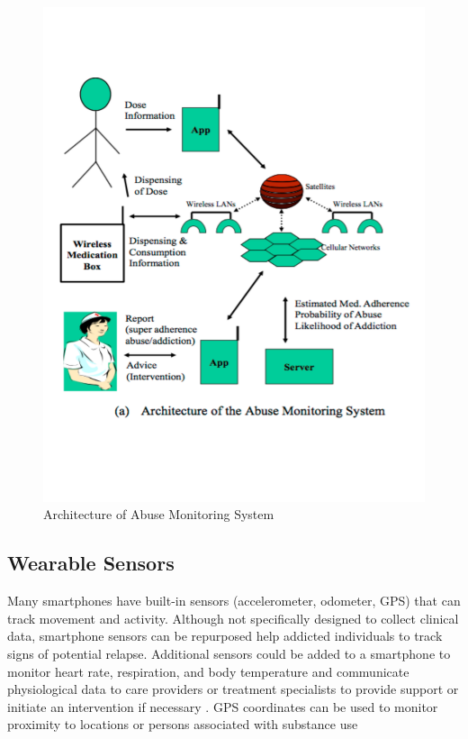 \documentclass[sigconf]{acmart}
\begin{document}
\begin{figure}[!ht]
  \centering\includegraphics[width=\columnwidth]{images/Figure3.pdf}
  \caption{Architecture of Abuse Monitoring System \cite{Varshney14}
  }\label{f:Figure3}
\end{figure}









\subsection{Wearable Sensors}

Many smartphones have built-in sensors (accelerometer, odometer, GPS) that can 
track movement and activity. Although not specifically designed to collect
clinical data, smartphone sensors can be repurposed help addicted individuals 
to track signs of  potential relapse. Additional sensors could be added to a 
smartphone to monitor heart rate, respiration, and body temperature and 
communicate physiological data to care providers or treatment specialists to
provide support or initiate an intervention if necessary \cite{johnson11}. 
GPS coordinates can be used to monitor proximity to locations or persons 
associated with substance use
\end{document}
